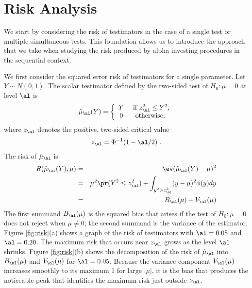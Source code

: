 \documentclass[12pt]{article}
\begin{document}
\section{ Risk Analysis}

 We start by considering the risk of testimators in the case of a single test or
 multiple simultaneous tests.  This foundation allows us to introduce the
 approach that we take when studying the risk produced by alpha investing
 procedures in the sequential context.


 We first consider the squared error risk of testimators for a single parameter.
  Let $Y \sim N(0,1)$.  The scalar testimator defined by the two-sided test of
 $H_0: \mu=0$ at level $\al$ is
 \begin{equation}
   \hat\mu_\al(Y) = \left\{
     \begin{array}{cc}
        Y & \mbox{ if } z_\al^2 \le Y^2, \cr
        0 & \mbox{ otherwise, }
      \end{array} \right.
 \label{eq:muHat}
 \end{equation}
 where $z_\al$ denotes the positive, two-sided critical value
 \begin{equation}
   z_\al = \Phi^{-1}(1-\al/2) \;.
 \label{eq:zAlpha}
 \end{equation}
 The risk of $\hat\mu_\al$ is
 \begin{eqnarray}
   R(\hat\mu_\al(Y), \mu) 
     &=& \ev(\hat\mu_\al(Y) - \mu)^2  \cr
     &=& \mu^2 \pr(Y^2 \le z_\al^2) 
         + \int_{y^2>z_\al^2} (y-\mu)^2 \phi(y) dy \cr
     &=& B_\al(\mu) + V_\al(\mu)
 \label{eq:risk_mu_al}
 \end{eqnarray}
 The first summand $B_\al(\mu)$ is the squared bias that arises if the test of
 $H_0: \mu=0$ does not reject when $\mu \ne 0$; the second summand is the
 variance of the estimator.  Figure \ref{fig:risk}(a) shows a graph of the risk
 of testimators with $\al=0.05$ and $\al = 0.20$.  The maximum risk that occurs
 near $z_\al$ grows as the level $\al$ shrinks.  Figure \ref{fig:risk}(b) shows
 the decomposition of the risk of $\hat\mu_\al$ into $B_\al(\mu)$ and
 $V_\al(\mu)$ for $\al = 0.05$.  Because the variance component $V_\al(\mu)$
 increases smoothly to its maximum 1 for large $|\mu|$, it is the bias that
 produces the noticeable peak that identifies the maximum risk just outside
 $z_\al$.
\end{document}
